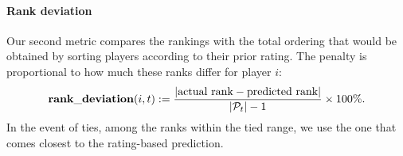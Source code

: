 \paragraph{Rank deviation}
Our second metric compares the rankings with the total ordering that would be obtained by sorting players according to their prior rating. The penalty is proportional to how much these ranks differ for player $i$:
\[\mathrm{\bf rank\_deviation}(i,t) := \frac{|\text{actual rank} - \text{predicted rank}|}{|\mathcal P_t|-1} \times 100\%.\]
In the event of ties, among the ranks within the tied range, we use the one that comes closest to the rating-based prediction.


